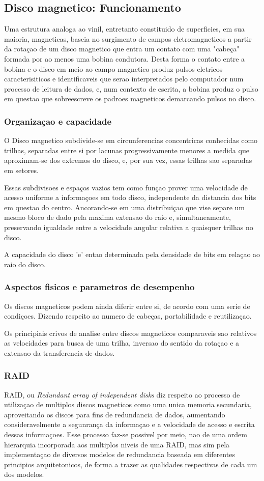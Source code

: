 \documentclass[12pt]{article}
\begin{document}
\subsection{Disco magnetico: Funcionamento}
Uma estrutura analoga ao vinil, entretanto constituido de superficies, em sua maioria, magneticas, baseia no surgimento de campos eletromagneticos a partir da rotaçao de um disco magnetico que entra um contato com uma "cabeça" formada por ao menos uma bobina condutora. Desta forma o contato entre a bobina e o disco em meio ao campo magnetico produz pulsos eletricos caracterisiticos e identificaveis que serao interpretados pelo computador num processo de leitura de dados, e, num contexto de escrita, a bobina produz o pulso em questao que sobreescreve os padroes magneticos demarcando pulsos no disco.
\subsubsection{Organizaçao e capacidade}
O Disco magnetico subdivide-se em circunferencias concentricas conhecidas como trilhas, separadas entre si por lacunas progressivamente menores a medida que aproximam-se dos extremos do disco, e, por sua vez, essas trilhas sao separadas em setores. 

Essas subdivisoes e espaços vazios tem como funçao prover uma velocidade de acesso uniforme a informaçoes em todo disco, independente da distancia dos bits em questao do centro. Ancorando-se em uma distribuiçao que vise separe um mesmo bloco de dado pela maxima extensao do raio e, simultaneamente, preservando igualdade entre a velocidade angular relativa a quaisquer trilhas no disco.


A capacidade do disco 'e' entao determinada pela densidade de bits em relaçao ao raio do disco.  

\subsubsection{Aspectos fisicos e parametros de desempenho}
Os discos magneticos podem ainda diferir entre si, de acordo com uma serie de condiçoes. Dizendo respeito ao numero de cabeças, portabilidade e reutilizaçao.

Os principiais crivos de analise entre discos magneticos comparaveis sao relativos as velocidades para busca de uma trilha, inversao do sentido da rotaçao e a extensao da transferencia de dados.

\subsubsection*{RAID}
RAID, ou \textit{Redundant array of independent disks} diz respeito ao processo de utilizaçao de multiplos discos magneticos como uma unica memoria secundaria, aproveitando os discos para fins de redundancia de dados, aumentando consideravelmente a segunrança da informaçao e a velocidade de acesso e escrita dessas informaçoes. Esse processo faz-se possivel por meio, nao de uma ordem hierarquia incorporada aos multiplos niveis de uma RAID, mas sim pela implementaçao de diversos modelos de redundancia baseada em diferentes principios arquitetonicos, de forma a trazer as qualidades respectivas de cada um dos modelos.
\end{document}
